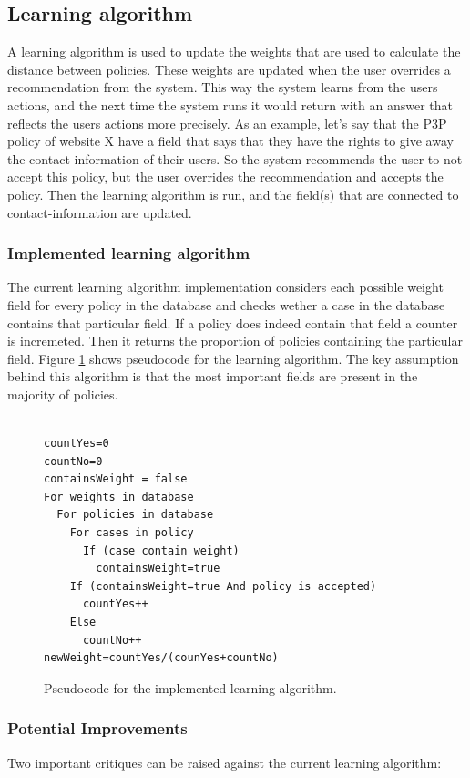 \subsection{Learning algorithm}\label{learnAlgos}
A learning algorithm is used to update the weights that are used to calculate the distance between policies. These weights are updated when the user overrides a recommendation from the system. This way the system learns from the users actions, and the next time the system runs it would return with an answer that reflects the users actions more precisely. As an example, let's say that the P3P policy of website X have a field that says that they have the rights to give away the contact-information of their users. So the system recommends the user to not accept this policy, but the user overrides the recommendation and accepts the policy. Then the learning algorithm is run, and the field(s) that are connected to contact-information are updated. 

\subsubsection{Implemented learning algorithm}
The current learning algorithm implementation considers each possible weight field for every policy in the database and checks wether a case in the database contains that particular field. If a policy does indeed contain that field a counter is incremeted. Then it returns the proportion of policies containing the particular field. Figure \ref{pseudoLearnAlg} shows pseudocode for the learning algorithm. The key assumption behind this algorithm is that the most important fields are present in the majority of policies.
 
\begin{figure}[htpb]

\begin{verbatim}

countYes=0
countNo=0
containsWeight = false
For weights in database
  For policies in database
    For cases in policy
      If (case contain weight)
        containsWeight=true
    If (containsWeight=true And policy is accepted)
      countYes++
    Else
      countNo++
newWeight=countYes/(counYes+countNo)	
\end{verbatim}
\caption{Pseudocode for the implemented learning algorithm.}
\label{pseudoLearnAlg}
\end{figure}

\subsubsection{Potential Improvements}
Two important critiques can be raised against the current learning algorithm:

